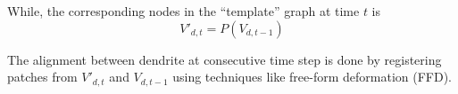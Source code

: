 \documentclass[10pt,letterpaper]{article}
\begin{document}
While, the corresponding nodes in the ``template'' graph at time $t$ is
\begin{equation}
V'_{d,t} = P( V_{d,t-1})
\end{equation}

The alignment between dendrite at consecutive time step is done by registering patches from $V'_{d,t}$ and $V_{d,t-1}$ using techniques like free-form deformation (FFD).


\small{}
\end{document}

